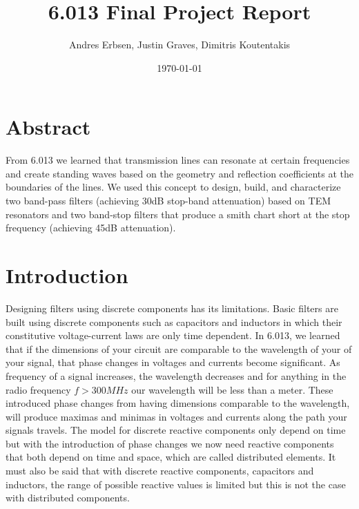\documentclass[letterpaper, 11pt, twocolumn]{article}
\begin{document}
\title{\vspace{-10mm} 6.013 Final Project Report}
\author{Andres Erbsen, Justin Graves, Dimitris Koutentakis}
\date{\today}
\maketitle
\vspace{5mm}
\section{Abstract}
From 6.013 we learned that transmission lines can resonate at certain
frequencies and create standing waves based on the geometry and reflection
coefficients at the boundaries of the lines. We used this concept to design,
build, and characterize two band-pass filters (achieving 30dB stop-band
attenuation) based on TEM resonators and two band-stop filters that produce a
smith chart short at the stop frequency (achieving 45dB attenuation).

\section {Introduction}
Designing filters using discrete components has its limitations. Basic filters are built using discrete components such as capacitors and inductors in which their constitutive voltage-current laws are only time dependent. In 6.013, we learned that if the dimensions of your circuit are comparable to the wavelength of your of your signal, that phase changes in voltages and currents become significant. As frequency of a signal increases, the wavelength decreases and for anything in the radio frequency $f > 300 MHz$ our wavelength will be less than a meter. These introduced phase changes from having dimensions comparable to the wavelength, will produce maximas and minimas in voltages and currents along the path your signals travels. The model for discrete reactive components only depend on time but with the introduction of phase changes we now need reactive components that both depend on time and space, which are called distributed elements. It must also be said that with discrete reactive components, capacitors and inductors, the range of possible reactive values is limited but this is not the case with distributed components. 
\end{document}
